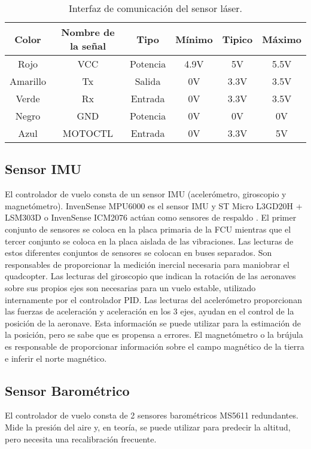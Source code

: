 \begin{table}[htbp]
\begin{center}
\begin{tabular}{|c|c|c|c|c|c|}
\hline
Color & Nombre de la señal & Tipo & Mínimo & Tipico & Máximo \\ 
\hline \hline
Rojo & VCC & Potencia & 4.9V & 5V & 5.5V \\ \hline
Amarillo & Tx & Salida & 0V & 3.3V & 3.5V \\ \hline
Verde & Rx & Entrada & 0V & 3.3V & 3.5V \\ \hline
Negro & GND & Potencia & 0V & 0V & 0V \\ \hline
Azul & MOTOCTL & Entrada & 0V & 3.3V & 5V \\ \hline
\end{tabular}
\caption{Interfaz de comunicación del sensor láser.}
\label{tbl:comunicacion}
\end{center}
\end{table}

\subsection{Sensor IMU}
El controlador de vuelo consta de un sensor IMU (acelerómetro, giroscopio y magnetómetro). InvenSense MPU6000 es el sensor IMU y ST Micro L3GD20H + LSM303D o InvenSense ICM2076 actúan como sensores de respaldo \cite{pixhawkIMU}. El primer conjunto de sensores se coloca en la placa primaria de la FCU mientras que el tercer conjunto se coloca en la placa aislada de las vibraciones. Las lecturas de estos diferentes conjuntos de sensores se colocan en buses separados. Son responsables de proporcionar la medición inercial necesaria para maniobrar el quadcopter. Las lecturas del giroscopio que indican la rotación de las aeronaves sobre sus propios ejes son necesarias para un vuelo estable, utilizado internamente por el controlador PID. Las lecturas del acelerómetro proporcionan las fuerzas de aceleración y aceleración en los 3 ejes, ayudan en el control de la posición de la aeronave. Esta información se puede utilizar para la estimación de la posición, pero se sabe que es propensa a errores. El magnetómetro o la brújula es responsable de proporcionar información sobre el campo magnético de la tierra e inferir el norte magnético.

\subsection{Sensor Barométrico}
El controlador de vuelo consta de 2 sensores barométricos MS5611 redundantes. Mide la presión del aire y, en teoría, se puede utilizar para predecir la altitud, pero necesita una recalibración frecuente.
 
